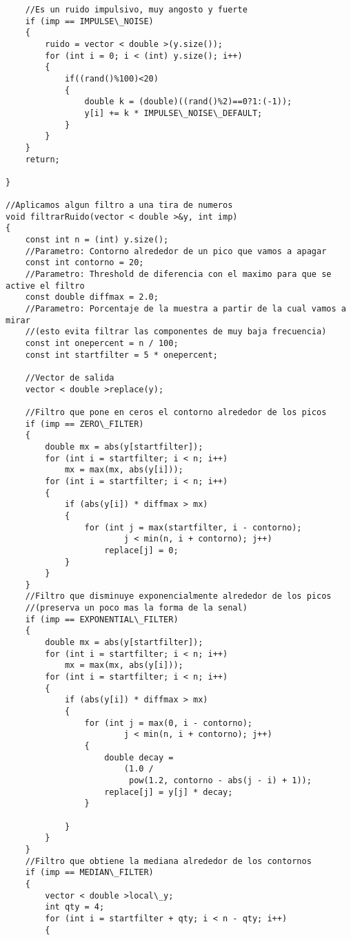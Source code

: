 \begin{lstlisting}
    //Es un ruido impulsivo, muy angosto y fuerte
    if (imp == IMPULSE\_NOISE)
    {
        ruido = vector < double >(y.size());
        for (int i = 0; i < (int) y.size(); i++)
        {
            if((rand()%100)<20)
            {
                double k = (double)((rand()%2)==0?1:(-1));
                y[i] += k * IMPULSE\_NOISE\_DEFAULT;
            }
        }
    }
    return;

}

//Aplicamos algun filtro a una tira de numeros
void filtrarRuido(vector < double >&y, int imp)
{
    const int n = (int) y.size();
    //Parametro: Contorno alrededor de un pico que vamos a apagar
    const int contorno = 20;
    //Parametro: Threshold de diferencia con el maximo para que se active el filtro
    const double diffmax = 2.0;
    //Parametro: Porcentaje de la muestra a partir de la cual vamos a mirar
    //(esto evita filtrar las componentes de muy baja frecuencia)
    const int onepercent = n / 100;
    const int startfilter = 5 * onepercent;

    //Vector de salida
    vector < double >replace(y);

    //Filtro que pone en ceros el contorno alrededor de los picos
    if (imp == ZERO\_FILTER)
    {
        double mx = abs(y[startfilter]);
        for (int i = startfilter; i < n; i++)
            mx = max(mx, abs(y[i]));
        for (int i = startfilter; i < n; i++)
        {
            if (abs(y[i]) * diffmax > mx)
            {
                for (int j = max(startfilter, i - contorno);
                        j < min(n, i + contorno); j++)
                    replace[j] = 0;
            }
        }
    }
    //Filtro que disminuye exponencialmente alrededor de los picos
    //(preserva un poco mas la forma de la senal)
    if (imp == EXPONENTIAL\_FILTER)
    {
        double mx = abs(y[startfilter]);
        for (int i = startfilter; i < n; i++)
            mx = max(mx, abs(y[i]));
        for (int i = startfilter; i < n; i++)
        {
            if (abs(y[i]) * diffmax > mx)
            {
                for (int j = max(0, i - contorno);
                        j < min(n, i + contorno); j++)
                {
                    double decay =
                        (1.0 /
                         pow(1.2, contorno - abs(j - i) + 1));
                    replace[j] = y[j] * decay;
                }

            }
        }
    }
    //Filtro que obtiene la mediana alrededor de los contornos
    if (imp == MEDIAN\_FILTER)
    {
        vector < double >local\_y;
        int qty = 4;
        for (int i = startfilter + qty; i < n - qty; i++)
        {


\end{lstlisting}
